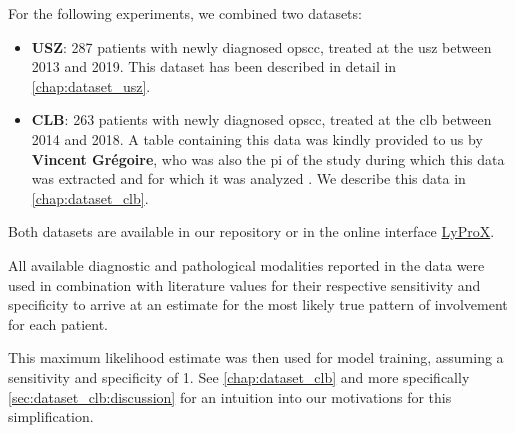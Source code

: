 \begin{tcolorbox}[title=\faIcon{database} Data, parbox=false]
    For the following experiments, we combined two datasets:

    \begin{itemize}[leftmargin=7mm]
        \item[\faIcon{hospital}] \textbf{USZ}: 287 patients with newly diagnosed \gls{opscc}, treated at the \acrlong{usz} between 2013 and 2019. This dataset has been described in detail in \cref{chap:dataset_usz}.
        \item[\faIcon{hospital}] \textbf{CLB}: 263 patients with newly diagnosed \gls{opscc}, treated at the \acrlong{clb} between 2014 and 2018. A table containing this data was kindly provided to us by \textbf{Vincent Grégoire}, who was also the \gls{pi} of the study during which this data was extracted and for which it was analyzed \cite{bauwens_prevalence_2021}. We describe this data in \cref{chap:dataset_clb}.
    \end{itemize}

    Both datasets are available in our repository  or in the online interface \href{https://lyprox.org/patients/dataset/}{ LyProX}.

    All available diagnostic and pathological modalities reported in the data were used in combination with literature values for their respective sensitivity and specificity \cite{de_bondt_detection_2007,kyzas_18f-fluorodeoxyglucose_2008} to arrive at an estimate for the most likely true pattern of involvement for each patient.

    This maximum likelihood estimate was then used for model training, assuming a sensitivity and specificity of 1. See \cref{chap:dataset_clb} and more specifically \cref{sec:dataset_clb:discussion} for an intuition into our motivations for this simplification.
\end{tcolorbox}

